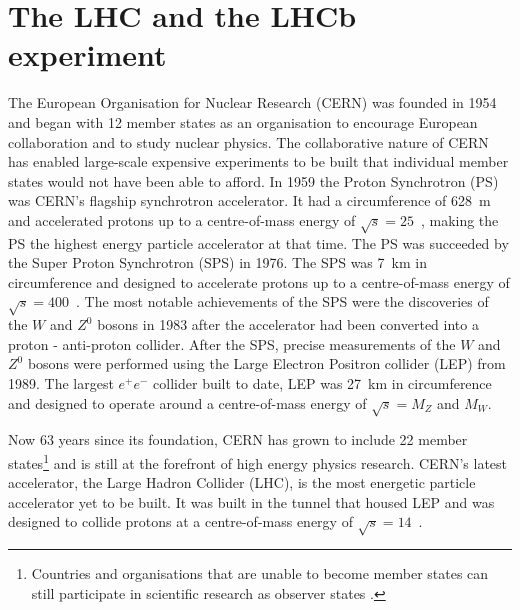 \chapter{{\bf The LHC and the LHCb experiment}}
\label{CERN_LHC_LHCb}

The European Organisation for Nuclear Research (CERN) was founded in 1954 and began with 12 member states as an organisation to encourage European collaboration and to study nuclear physics. The collaborative nature of CERN has enabled large-scale expensive experiments to be built that individual member states would not have been able to afford. In 1959 the Proton Synchrotron (PS) was CERN's flagship synchrotron accelerator. It had a circumference of 628~m and accelerated protons up to a centre-of-mass energy of $\sqrt{s} = 25$~\gev, making the PS the highest energy particle accelerator at that time. 
The PS was succeeded by the Super Proton Synchrotron (SPS) in 1976. The SPS was 7~km in circumference and designed to accelerate protons up to a centre-of-mass energy of $\sqrt{s} = 400$~\gev. The most notable achievements of the SPS were the discoveries of the $W$ and $Z^0$ bosons in 1983 after the accelerator had been converted into a proton - anti-proton collider. After the SPS, precise measurements of the $W$ and $Z^0$ bosons were performed using the Large Electron Positron collider (LEP) from 1989. The largest $e^+e^-$ collider built to date, LEP was 27~km in circumference and designed to operate around a centre-of-mass energy of $\sqrt{s} = M_{Z}$ and $M_{W}$. %

Now 63 years since its foundation, CERN has grown to include 22 member states\footnote{Countries and organisations that are unable to become member states can still participate in scientific research as observer states \cite{Member_States}.} and is still at the forefront of high energy physics research. CERN’s latest accelerator, the Large Hadron Collider (LHC), is the most energetic particle accelerator yet to be built. It was built in the tunnel that housed LEP and was designed to collide protons at a centre-of-mass energy of $\sqrt{s} = 14$~\tev. 

